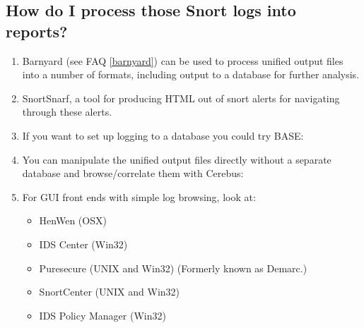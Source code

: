 \documentclass{article}
\newcommand{\myref}[1]{(see FAQ \ref{#1})}
\begin{document}
\subsection{How do I process those Snort logs into reports?}
\begin{enumerate}
\item  Barnyard \myref{barnyard} can be used to process unified output files into a number of
    formats, including output to a database for further analysis.
\item  SnortSnarf, a tool for producing HTML out of snort alerts for navigating
    through these alerts.


\item  If you want to set up logging to a database you could try BASE:


\item  You can manipulate the unified output files directly without a separate
    database and browse/correlate them with Cerebus:


\item For GUI front ends with simple log browsing, look at:
    \begin{itemize}
      \item HenWen (OSX)



      \item IDS Center (Win32) \label{IDSCenter}


     \item Puresecure (UNIX and Win32) (Formerly known as Demarc.)


      \item SnortCenter (UNIX and Win32)


      \item IDS Policy Manager (Win32)

 \end{itemize}
 \end{enumerate}
\end{document}
